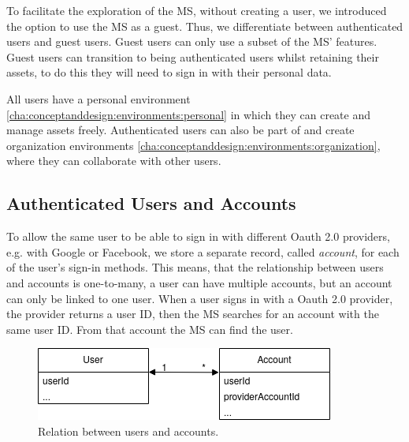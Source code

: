 To facilitate the exploration of the MS, without creating a user, we introduced the option
to use the MS as a guest.
Thus, we differentiate between authenticated users and guest users.
Guest users can only use a subset of the MS' features.
Guest users can transition to being authenticated users whilst retaining their
assets, to do this they will need to sign in with their personal data.

All users have a personal environment \ref{cha:conceptanddesign:environments:personal}
in which they can create and manage assets freely.
Authenticated users can also be part of and create organization environments
\ref{cha:conceptanddesign:environments:organization},
where they can collaborate with other users.

\subsection{Authenticated Users and Accounts}

To allow the same user to be able to sign in with different Oauth 2.0 providers, e.g. with
Google or Facebook,
we store a separate record, called \textit{account}, for each of the user's sign-in methods.
This means, that the relationship between users and accounts is one-to-many,
a user can have multiple accounts, but an account can only be linked to one user.
When a user signs in with a Oauth 2.0 provider, the provider returns a user ID, 
then the MS searches for an account with the same user ID.
From that account the MS can find the user.

\begin{figure}[H]
	\centering
	\includegraphics[scale=0.6]{images/users-accounts-relation.drawio.png}
	\caption{Relation between users and accounts.}
	\vspace{-1em} %
\end{figure}

